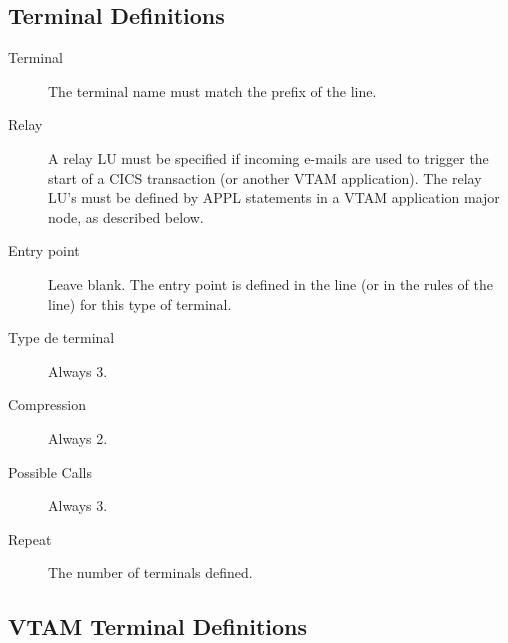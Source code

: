 \documentclass[letterpaper,10pt,english]{sphinxmanual}
\begin{document}
\subsection{Terminal Definitions}
\label{\detokenize{connectivity_guide:id4}}\label{\detokenize{connectivity_guide:index-19}}\begin{description}
\item[{Terminal}] \leavevmode
The terminal name must match the prefix of the line.

\item[{Relay}] \leavevmode
A relay LU must be specified if incoming e-mails are used to trigger the start of a CICS transaction (or another VTAM application). The relay LU’s must be defined by APPL statements in a VTAM application major node, as described below.

\item[{Entry point}] \leavevmode
Leave blank. The entry point is defined in the line (or in the rules of the line) for this type of terminal.

\item[{Type de terminal}] \leavevmode
Always 3.

\item[{Compression}] \leavevmode
Always 2.

\item[{Possible Calls}] \leavevmode
Always 3.

\item[{Repeat}] \leavevmode
The number of terminals defined.

\end{description}


\subsection{VTAM Terminal Definitions}
\label{\detokenize{connectivity_guide:index-20}}\label{\detokenize{connectivity_guide:id5}}
\begin{sphinxVerbatim}[commandchars=\\\{\}]
  
  
  
  
\end{sphinxVerbatim}
\end{document}
